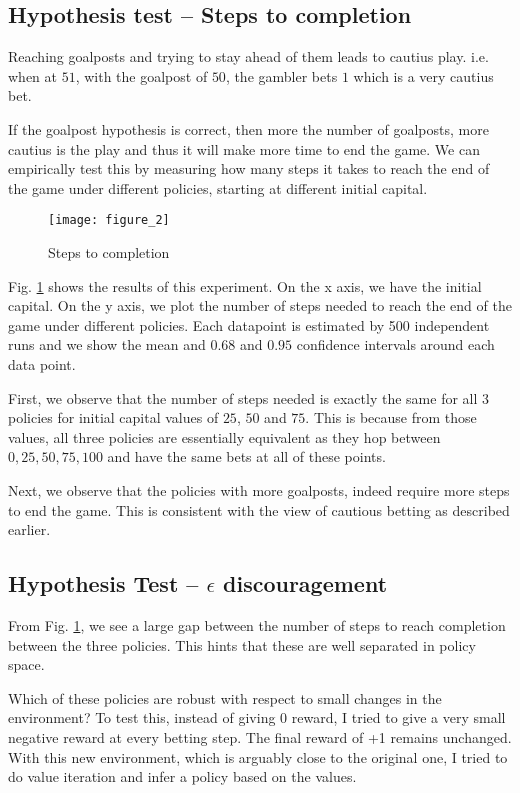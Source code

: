 \documentclass{article}
\begin{document}
\subsection{Hypothesis test -- Steps to completion}

Reaching goalposts and trying to stay ahead of them leads to cautius play. i.e. when at $51$, with the goalpost of $50$, the gambler bets $1$ which is a very cautius bet.

If the goalpost hypothesis is correct, then more the number of goalposts, more cautius is the play and thus it will make more time to end the game. We can empirically test this by measuring how many steps it takes to reach the end of the game under different policies, starting at different initial capital.

\begin{figure}
    \centering
    \texttt{[image: figure\_2]}
    \caption{Steps to completion}
    \label{steps}
\end{figure}

Fig. \ref{steps} shows the results of this experiment. On the x axis, we have the initial capital. On the y axis, we plot the number of steps needed to reach the end of the game under different policies. Each datapoint is estimated by 500 independent runs and we show the mean and $0.68$ and $0.95$ confidence intervals around each data point.

First, we observe that the number of steps needed is exactly the same for all 3 policies for initial capital values of $25$, $50$ and $75$. This is because from those values, all three policies are essentially equivalent as they hop between ${0, 25, 50, 75, 100}$ and have the same bets at all of these points.

Next, we observe that the policies with more goalposts, indeed require more steps to end the game. This is consistent with the view of cautious betting as described earlier.

\subsection{Hypothesis Test -- $\epsilon$ discouragement}

From Fig. \ref{steps}, we see a large gap between the number of steps to reach completion between the three policies. This hints that these are well separated in policy space.

Which of these policies are robust with respect to small changes in the environment? To test this, instead of giving $0$ reward, I tried to give a very small negative reward at every betting step. The final reward of +1 remains unchanged. With this new environment, which is arguably close to the original one, I tried to do value iteration and infer a policy based on the values.
\end{document}
